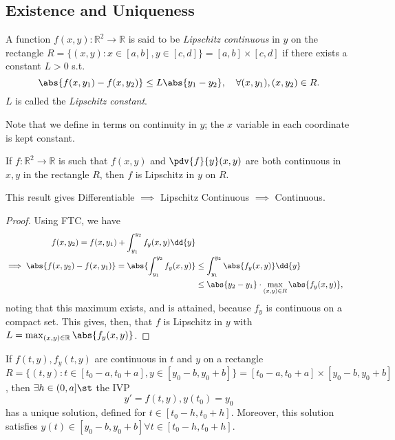 \subsection{Existence and Uniqueness}

\begin{definition}
    A function $f(x, y) : \mathbb{R}^2 \to \mathbb{R}$ is said to be \emph{Lipschitz continuous} in $y$ on the rectangle $R = \{(x, y) : x \in [a, b], y \in [c, d]\} = [a, b] \times [c ,d]$ if there exists a constant $L > 0$ s.t. \[
    \abs{f(x, y_1) - f(x, y_2)}    \leq L \abs{y_1 - y_2}, \quad \forall (x, y_1), (x, y_2) \in R.
    \]
    $L$ is called the \emph{Lipschitz constant}.
\end{definition}

\begin{remark}
    Note that we define in terms on continuity in $y$; the $x$ variable in each coordinate is kept constant.
\end{remark}

\begin{lemma}
    If $f: \mathbb{R}^2 \to \mathbb{R}$ is such that $f(x, y)$ and $\pdv{f}{y}(x, y)$ are both continuous in $x, y$ in the rectangle $R$, then $f$ is Lipschitz in $y$ on $R$.
\end{lemma}

\begin{remark}
    This result gives Differentiable $\implies$ Lipschitz Continuous $\implies$ Continuous.
\end{remark}

\begin{proof}
    Using FTC, we have \begin{align*}
    f(x, y_2) = f(x, y_1) + \int_{y_1}^{y_2} f_y(x, y)\dd{y}    \\
    \implies \abs{f(x, y_2) - f(x, y_1)} = \abs{\int_{y_1}^{y_2} f_y(x, y)} &\leq \int_{y_1}^{y_2} \abs{f_y(x, y)} \dd{y}\\
    &\leq \abs{y_2 - y_1} \cdot \max_{(x, y) \in R}\abs{f_y(x, y)},
    \end{align*}
noting that this maximum exists, and is attained, because $f_y$ is continuous on a compact set. This gives, then, that $f$ is Lipschitz in $y$ with $L = \max_{(x, y) \in \mathbb{R}} \abs{f_y (x, y)}$.
\end{proof}

\newpage
\begin{theorem}
    If $f(t, y), f_y(t, y)$ are continuous in $t$ and $y$ on a rectangle $R = \{(t, y) : t \in [t_0- a, t_0 + a], y \in [y_0 - b, y_0 + b]\} = [t_0 - a, t_0 + a] \times [y_0 - b, y_0 + b]$, then $\exists h \in (0, a] \st$ the IVP $$y' = f(t, y), y(t_0) = y_0$$ has a unique solution, defined for $t \in [t_0 - h, t_0 + h]$. Moreover, this solution satisfies $y(t) \in [y_0 - b, y_0 + b] \forall t \in [t_0 - h, t_0 + h]$.
\end{theorem}

